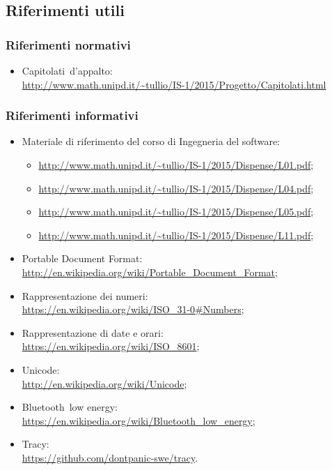 \documentclass[../NormeProgetto.tex]{subfiles}
\begin{document}
	\subsection{Riferimenti utili}
		\subsubsection{Riferimenti normativi}
		\begin{itemize}
			\item Capitolati\g\ d'appalto: \\\url{http://www.math.unipd.it/~tullio/IS-1/2015/Progetto/Capitolati.html}
		\end{itemize}
		\subsubsection{Riferimenti informativi}
		\begin{itemize}
			\item Materiale di riferimento del corso di Ingegneria del software\g:
				\begin{itemize}
					 \item \url{http://www.math.unipd.it/~tullio/IS-1/2015/Dispense/L01.pdf};
					 \item \url{http://www.math.unipd.it/~tullio/IS-1/2015/Dispense/L04.pdf};
					 \item \url{http://www.math.unipd.it/~tullio/IS-1/2015/Dispense/L05.pdf};
					 \item \url{http://www.math.unipd.it/~tullio/IS-1/2015/Dispense/L11.pdf};
				\end{itemize}
			\item Portable Document Format:  \\\url{http://en.wikipedia.org/wiki/Portable_Document_Format};
			\item Rappresentazione dei numeri: \\\url{https://en.wikipedia.org/wiki/ISO_31-0#Numbers};
			\item Rappresentazione di date e orari: \\\url{https://en.wikipedia.org/wiki/ISO_8601};
			\item Unicode\g: \\\url{http://en.wikipedia.org/wiki/Unicode};
			\item Bluetooth\g\ low energy: \\\url{https://en.wikipedia.org/wiki/Bluetooth_low_energy};
			\item Tracy\g: \\\url{https://github.com/dontpanic-swe/tracy}.
		\end{itemize}
\end{document}
